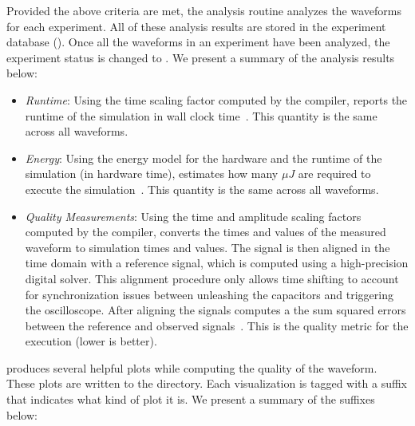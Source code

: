  Provided the above criteria are met, the analysis routine analyzes 
 the waveforms for each experiment. All of these analysis results
  are stored in the experiment database (). Once all the
  waveforms in an experiment have been analyzed, the experiment status is
  changed to . We present a summary of the analysis results below:

  \begin{itemize}
   \item\textit{Runtime}: Using the time scaling factor computed by
     the \legno compiler, \expdriver reports the runtime of the simulation in
     wall clock time~\cite{params.py}. This quantity is the same across all waveforms.
  \item\textit{Energy}: Using the energy model for the
    hardware and the runtime of the simulation (in hardware time), \expdriver
    estimates how many $\mu J$ are required to execute the
    simulation~\cite{energy_model.py,energy.py}. This quantity is the same
    across all waveforms.
  \item\textit{Quality Measurements}: Using the time and amplitude scaling
    factors computed by the \legno compiler, \expdriver converts the times and
    values of the measured waveform to simulation times and values. The signal
    is then aligned in the time domain with a reference signal, which is computed using a
    high-precision digital solver. This alignment procedure only allows time
    shifting to account for synchronization issues between unleashing the
    capacitors and triggering the oscilloscope. After aligning the signals
    \expdriver computes a the sum squared errors between the reference and
    observed signals~\cite{quality.py,params.py}. This is the quality metric for
    the execution (lower is better).
   
\end{itemize}

\expdriver produces several helpful plots while
computing the quality of the waveform. These plots are written to the
 directory. Each visualization is tagged
with a suffix that indicates what kind of plot it is. We present a summary of
the suffixes below:

